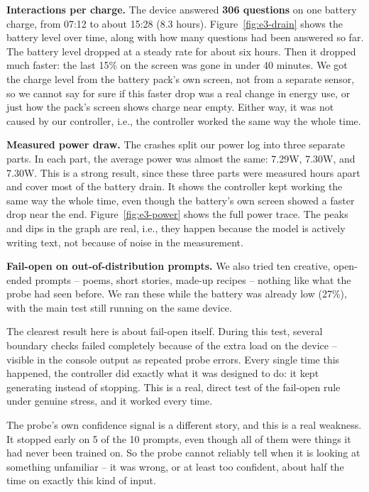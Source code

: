 \documentclass[review,12pt]{elsarticle}
\begin{document}
\textbf{Interactions per charge.} The device answered \textbf{306
questions} on one battery charge, from 07:12 to about 15:28 (8.3
hours). Figure~\ref{fig:e3-drain} shows the battery level over time,
along with how many questions had been answered so far. The battery
level dropped at a steady rate for about six hours. Then it dropped
much faster: the last 15\% on the screen was gone in under 40 minutes.
We got the charge level from the battery pack's own screen, not from a
separate sensor, so we cannot say for sure if this faster drop was a
real change in energy use, or just how the pack's screen shows charge
near empty. Either way, it was not caused by our controller, i.e.,  the
controller worked the same way the whole time.

\textbf{Measured power draw.} The crashes split our power log into
three separate parts. In each part, the average power was almost the
same: 7.29W, 7.30W, and 7.30W. This is a strong result, since these
three parts were measured hours apart and cover most of the battery
drain. It shows the controller kept working the same way the whole
time, even though the battery's own screen showed a faster drop near
the end. Figure~\ref{fig:e3-power} shows the full power trace. The
peaks and dips in the graph are real, i.e., they happen because the model
is actively writing text, not because of noise in the measurement.





\textbf{Fail-open on out-of-distribution prompts.} We also tried ten
creative, open-ended prompts -- poems, short stories, made-up recipes
-- nothing like what the probe had seen before. We ran these while the
battery was already low (27\%), with the main test still running on
the same device.

The clearest result here is about fail-open itself. During this test,
several boundary checks failed completely because of the extra load on
the device -- visible in the console output as repeated probe errors.
Every single time this happened, the controller did exactly what it
was designed to do: it kept generating instead of stopping. This is a
real, direct test of the fail-open rule under genuine stress, and it
worked every time.

The probe's own confidence signal is a different story, and this is a
real weakness. It stopped early on 5 of the 10 prompts, even though
all of them were things it had never been trained on. So the probe
cannot reliably tell when it is looking at something unfamiliar -- it
was wrong, or at least too confident, about half the time on exactly
this kind of input.
\end{document}

